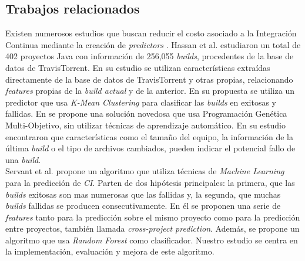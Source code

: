\subsection{Trabajos relacionados}
Existen numerosos estudios que buscan reducir el costo asociado a la Integración Continua
mediante la creación de \textit{predictors} \cite{8,5,2,18,7,17,4,1,22}. Hassan et al. \cite{8}
estudiaron un total de 402 proyectos Java con información de 256,055 \textit{builds}, procedentes
de la base de datos de TravisTorrent. En su estudio se utilizan características extraídas
directamente de la base de datos de TravisTorrent y otras propias, relacionando \textit{features}
propias de la \textit{build actual} y de la anterior. En su propuesta se utiliza un predictor
que usa \textit{K-Mean Clustering} para clasificar las \textit{builds} en exitosas y fallidas.
En \cite{5} se propone una solución novedosa que usa Programación Genética Multi-Objetivo, sin
utilizar técnicas de aprendizaje automático. En su estudio encontraron que características
como el tamaño del equipo, la información de la última \textit{build} o el tipo de archivos
cambiados, pueden indicar el potencial fallo de una \textit{build}.\\

Servant et al. \cite{2} propone un algoritmo que utiliza técnicas de \textit{Machine Learning}
para la predicción de \textit{CI}. Parten de dos hipótesis principales: la primera, que las
\textit{builds} exitosas son mas numerosas que las fallidas y, la segunda, que muchas
\textit{builds} fallidas se producen consecutivamente. En él se proponen una serie de
\textit{features} tanto para la predicción sobre el mismo proyecto como para la predicción
entre proyectos, también llamada \textit{cross-project prediction}. Además, se propone un
algoritmo que usa \textit{Random Forest} como clasificador. Nuestro estudio se centra en
la implementación, evaluación y mejora de este algoritmo.\\

